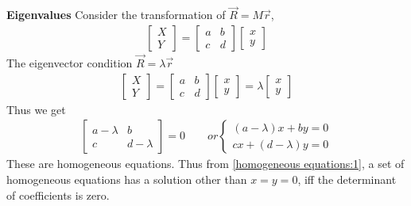             \bulletpar \textbf{Eigenvalues} Consider the transformation of $\vec{R} = M\vec{r}$,
            \begin{align}
                \label{eq:eigenvalue:1}
                \begin{bmatrix}
                    X \\ Y
                \end{bmatrix} = 
                \begin{bmatrix}
                    a & b \\ c & d
                \end{bmatrix}
                \begin{bmatrix}
                    x \\ y
                \end{bmatrix}
            \end{align}
            The eigenvector condition $\vec{R} = \lambda \vec{r}$
            \begin{align}
                \label{eq:eigenvalue:2}
                \begin{bmatrix}
                    X \\ Y
                \end{bmatrix} = 
                \begin{bmatrix}
                    a & b \\ c & d
                \end{bmatrix}
                \begin{bmatrix}
                    x \\ y
                \end{bmatrix} = 
                \lambda \begin{bmatrix}
                    x \\ y
                \end{bmatrix}
            \end{align}
            Thus we get
            \begin{align}
                \label{eq:eigenvalue:3}
                \begin{bmatrix}
                    a - \lambda & b \\ c & d - \lambda
                \end{bmatrix} = 0 \qquad or
                \begin{cases}
                    (a- \lambda)x + b y = 0 \\
                    c x + (d- \lambda)y = 0
                \end{cases}
            \end{align}
            These are homogeneous equations. Thus from \eqref{homogeneous equations:1}, a set of homogeneous equations has a solution other than $x=y=0$, iff the 
            determinant of coefficients is zero.


